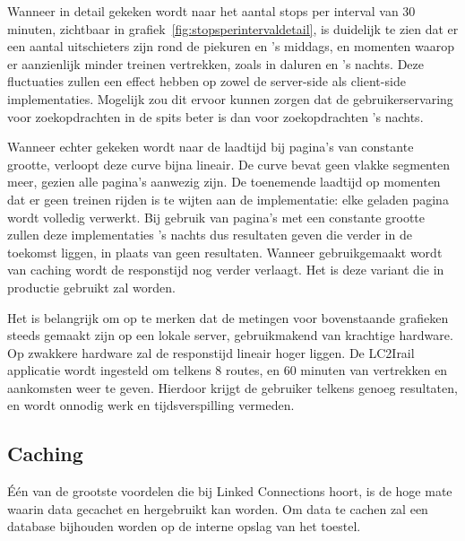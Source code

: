 Wanneer in detail gekeken wordt naar het aantal stops per interval van 30 minuten, zichtbaar in grafiek~\ref{fig:stopsperintervaldetail}, is duidelijk te zien dat er een aantal uitschieters zijn rond de piekuren en 's middags, en momenten waarop er aanzienlijk minder treinen vertrekken, zoals in daluren en 's nachts. Deze fluctuaties zullen een effect hebben op zowel de server-side als client-side implementaties. Mogelijk zou dit ervoor kunnen zorgen dat de gebruikerservaring voor zoekopdrachten in de spits beter is dan voor zoekopdrachten 's nachts.

Wanneer echter gekeken wordt naar de laadtijd bij pagina's van constante grootte, verloopt deze curve bijna lineair. De curve bevat geen vlakke segmenten meer, gezien alle pagina's aanwezig zijn. De toenemende laadtijd op momenten dat er geen treinen rijden is te wijten aan de implementatie: elke geladen pagina wordt volledig verwerkt. Bij gebruik van pagina's met een constante grootte zullen deze implementaties 's nachts dus resultaten geven die verder in de toekomst liggen, in plaats van geen resultaten. Wanneer gebruikgemaakt wordt van caching wordt de responstijd nog verder verlaagt. Het is deze variant die in productie gebruikt zal worden. 

Het is belangrijk om op te merken dat de metingen voor bovenstaande grafieken steeds gemaakt zijn op een lokale server, gebruikmakend van krachtige hardware. Op zwakkere hardware zal de responstijd lineair hoger liggen. De LC2Irail applicatie wordt ingesteld om telkens 8 routes, en 60 minuten van vertrekken en aankomsten weer te geven. Hierdoor krijgt de gebruiker telkens genoeg resultaten, en wordt onnodig werk en tijdsverspilling vermeden.

\subsection{Caching}
Één van de grootste voordelen die bij Linked Connections hoort, is de hoge mate waarin data gecachet en hergebruikt kan worden. Om data te cachen zal een  database bijhouden worden op de interne opslag van het toestel.

